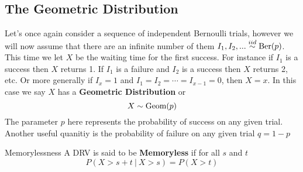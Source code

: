 \subsection{The Geometric Distribution}
    \newcommand{\geom}{\textup{Geom}}
    Let's once again consider a sequence of independent Bernoulli trials, however we will now assume that there are an infinite number of them $I_1,I_2,...\overset{iid}\sim \textup{Ber}(p)$. This time we let $X$ be the waiting time for the first success. For instance if $I_1$ is a success then $X$ returns 1. If $I_1$ is a failure and $I_2$ is a success then $X$ returns 2, etc. Or more generally if $I_x=1$ and $I_1=I_2=\cdots =I_{x-1}=0$, then $X=x$. In this case we say $X$ has a \textbf{Geometric Distribution} or
    \[
        X\sim\geom(p)
    \]
    The parameter $p$ here represents the probability of success on any given trial. Another useful quanitiy is the probability of failure on any given trial $q=1-p$
    \begin{definition}{Memorylessness}
        A DRV is said to be \textbf{Memoryless} if for all $s$ and $t$
        \[
            P(X>s+t\ |\ X>s)=P(X>t)
        \]
    \end{definition}
